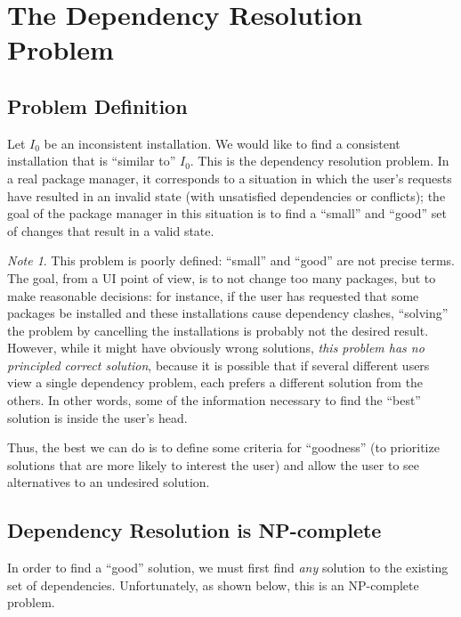 \documentclass[letterpaper]{article}
\theoremstyle{definition}
\theoremstyle{remark}
\newtheorem*{note}{Note}
\begin{document}
\section{The Dependency Resolution Problem}

\subsection{Problem Definition}

Let $I_0$ be an inconsistent installation.  We would like to find a
consistent installation that is ``similar to'' $I_0$.  This is the
dependency resolution problem.  In a real package manager, it
corresponds to a situation in which the user's requests have resulted
in an invalid state (with unsatisfied dependencies or conflicts); the
goal of the package manager in this situation is to find a ``small''
and ``good'' set of changes that result in a valid state.

\begin{note}
  This problem is poorly defined: ``small'' and ``good'' are not
  precise terms.  The goal, from a UI point of view, is to not change
  too many packages, but to make reasonable decisions: for instance,
  if the user has requested that some packages be installed and these
  installations cause dependency clashes, ``solving'' the problem by
  cancelling the installations is probably not the desired result.
  However, while it might have obviously wrong solutions, \emph{this
    problem has no principled correct solution}, because it is
  possible that if several different users view a single dependency
  problem, each prefers a different solution from the others.  In
  other words, some of the information necessary to find the ``best''
  solution is inside the user's head.

  Thus, the best we can do is to define some criteria for ``goodness''
  (to prioritize solutions that are more likely to interest the user)
  and allow the user to see alternatives to an undesired solution.
\end{note}

\subsection{Dependency Resolution is NP-complete}

In order to find a ``good'' solution, we must first find \emph{any}
solution to the existing set of dependencies.  Unfortunately, as shown
below, this is an NP-complete problem.
\end{document}
